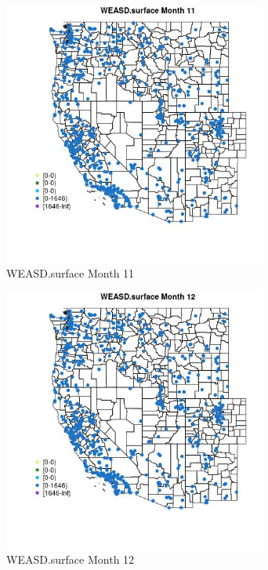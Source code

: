 \begin{figure} 
\centering  
\includegraphics[width=0.77\textwidth]{Code_Outputs/Report_ML_input_PM25_Step4_part_e_de_duplicated_aves_compiled_2019-05-21wNAs_MapObsMo11WEASDsurface.jpg} 
\caption{\label{fig:Report_ML_input_PM25_Step4_part_e_de_duplicated_aves_compiled_2019-05-21wNAsMapObsMo11WEASDsurface}WEASD.surface Month 11} 
\end{figure} 
 

\clearpage 

\begin{figure} 
\centering  
\includegraphics[width=0.77\textwidth]{Code_Outputs/Report_ML_input_PM25_Step4_part_e_de_duplicated_aves_compiled_2019-05-21wNAs_MapObsMo12WEASDsurface.jpg} 
\caption{\label{fig:Report_ML_input_PM25_Step4_part_e_de_duplicated_aves_compiled_2019-05-21wNAsMapObsMo12WEASDsurface}WEASD.surface Month 12} 
\end{figure} 
 

